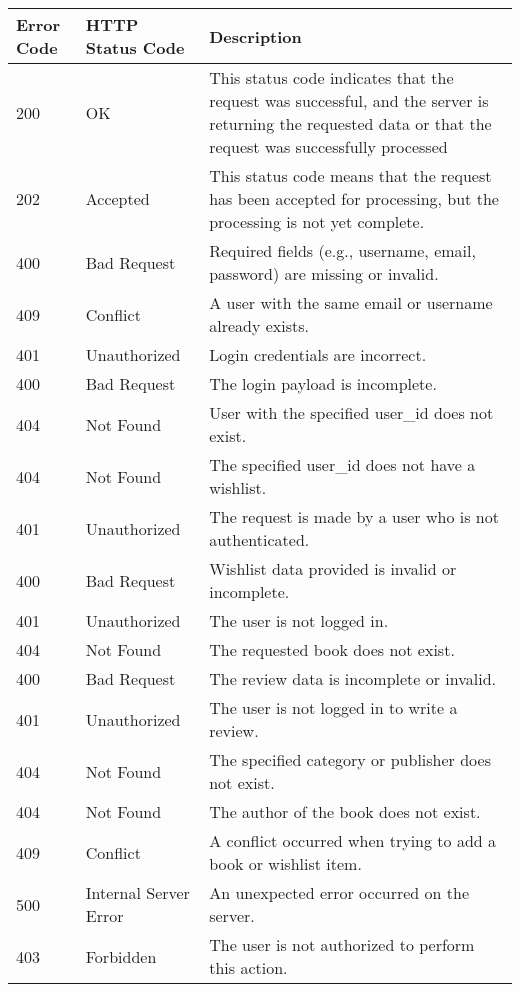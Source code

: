 \begin{longtable}{|p{}|p{} |p{}|} 
\hline
\textbf{Error Code} & \textbf{HTTP Status Code} & \textbf{Description} \\\hline

\hline 
200 & OK & This status code indicates that the request was successful, and the server is returning the requested data or that the request was successfully processed \\
\hline 
202 & Accepted & This status code means that the request has been accepted for processing, but the processing is not yet complete. \\
\hline 
400 & Bad Request & Required fields (e.g., username, email, password) are missing or invalid. \\
\hline 
409 & Conflict & A user with the same email or username already exists. \\
\hline 
401 & Unauthorized & Login credentials are incorrect. \\
\hline
400 & Bad Request & The login payload is incomplete. \\
\hline
404 & Not Found & User with the specified user\_id does not exist. \\
\hline
404 & Not Found & The specified user\_id does not have a wishlist. \\
\hline
401 & Unauthorized & The request is made by a user who is not authenticated. \\
\hline
400 & Bad Request & Wishlist data provided is invalid or incomplete. \\
\hline
401 & Unauthorized & The user is not logged in. \\
\hline
404 & Not Found & The requested book does not exist. \\
\hline
400 & Bad Request & The review data is incomplete or invalid. \\
\hline
401 & Unauthorized & The user is not logged in to write a review. \\
\hline
404 & Not Found & The specified category or publisher does not exist. \\
\hline
404 & Not Found & The author of the book does not exist. \\
\hline
409 & Conflict & A conflict occurred when trying to add a book or wishlist item. \\
\hline
500 & Internal Server Error & An unexpected error occurred on the server. \\
\hline
403 & Forbidden & The user is not authorized to perform this action. \\

\end{longtable}
